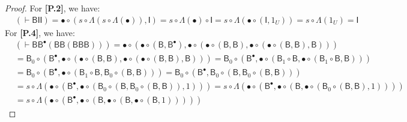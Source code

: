 \documentclass{llncs}
\begin{document}
\begin{proof}
For {\bf [P.2]}, we have:
\begin{align*}
  & (\vdash \mathsf{BII})
    = \bullet \circ (s \circ \Lambda(s \circ \Lambda(\bullet)),\mathsf{I})
    = s \circ \Lambda(\bullet) \circ \mathsf{I}
    = s \circ \Lambda(\bullet \circ (\mathsf{I},1_U))
    = s \circ \Lambda(1_U)
    = \mathsf{I}
\end{align*}
For {\bf [P.4]}, we have:
\begin{align*}
  & (\vdash \mathsf{BB}^\bullet(\mathsf{BB}(\mathsf{BBB})))
    = \bullet \circ (\bullet \circ (\mathsf{B},\mathsf{B}^\bullet),\bullet \circ (\bullet \circ (\mathsf{B},\mathsf{B}), \bullet  \circ (\bullet \circ (\mathsf{B},\mathsf{B}),\mathsf{B})))
      \\&= \mathsf{B}_0 \circ (\mathsf{B}^\bullet, \bullet \circ (\bullet \circ (\mathsf{B},\mathsf{B}), \bullet \circ (\bullet \circ (\mathsf{B},\mathsf{B}), \mathsf{B})))
      = \mathsf{B}_0 \circ (\mathsf{B}^\bullet, \bullet \circ (\mathsf{B}_1 \circ \mathsf{B}, \bullet \circ (\mathsf{B}_1 \circ \mathsf{B}, \mathsf{B})))
      \\&= \mathsf{B}_0 \circ (\mathsf{B}^\bullet, \bullet \circ (\mathsf{B}_1 \circ \mathsf{B}, \mathsf{B}_0 \circ (\mathsf{B},\mathsf{B})))
      = \mathsf{B}_0 \circ (\mathsf{B}^\bullet, \mathsf{B}_0 \circ (\mathsf{B}, \mathsf{B}_0 \circ (\mathsf{B},\mathsf{B})))
      \\& = s \circ \Lambda(\bullet \circ (\mathsf{B}^\bullet,\bullet \circ (\mathsf{B}_0 \circ (\mathsf{B}, \mathsf{B}_0 \circ (\mathsf{B},\mathsf{B})),1)))
      = s \circ \Lambda(\bullet \circ (\mathsf{B}^\bullet,\bullet \circ (\mathsf{B},\bullet \circ (\mathsf{B}_0 \circ (\mathsf{B},\mathsf{B}),1))))
      \\&= s \circ \Lambda(\bullet \circ (\mathsf{B}^\bullet, \bullet \circ (\mathsf{B},\bullet \circ (\mathsf{B},\bullet \circ (\mathsf{B},1)))))

\end{align*}
\end{proof}
\end{document}
